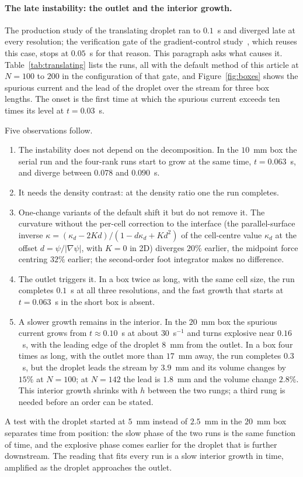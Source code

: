 \documentclass[preprint,3p,11pt]{elsarticle}
\newcommand{\psilev}{\psi}                       %
\newcommand{\gradpsi}{\lvert\nabla\psilev\rvert}
\begin{document}
\paragraph{The late instability: the outlet and the interior growth.}
\label{sec:translating-late}
The production study of the translating droplet ran to $0.1$~s and diverged late at every
resolution; the verification gate of the gradient-control study~\cite{maric2026gcls},
which reuses this case, stops at $0.05$~s for that reason. This paragraph asks what causes
it. Table~\ref{tab:translating} lists the runs, all with the default method of this
article at $N=100$ to $200$ in the configuration of that gate, and Figure~\ref{fig:boxes}
shows the spurious current and the lead of the droplet over the stream for three box
lengths. The onset is the first time at which the spurious current exceeds ten times its
level at $t=0.03$~s.

Five observations follow.
\begin{enumerate}
  \item The instability does not depend on the decomposition. In the $10$~mm box the
  serial run and the four-rank runs start to grow at the same time, $t=0.063$~s, and
  diverge between $0.078$ and $0.090$~s.
  \item It needs the density contrast: at the density ratio one the run completes.
  \item One-change variants of the default shift it but do not remove it. The curvature
  without the per-cell correction to the interface (the parallel-surface inverse
  $\kappa=(\kappa_d-2Kd)/(1-d\kappa_d+Kd^2)$ of the cell-centre value $\kappa_d$ at the
  offset $d=\psilev/\gradpsi$, with $K=0$ in 2D) diverges $20\%$ earlier, the midpoint
  force centring $32\%$ earlier; the second-order foot integrator makes no difference.
  \item The outlet triggers it. In a box twice as long, with the same cell size, the run
  completes $0.1$~s at all three resolutions, and the fast growth that starts at
  $t=0.063$~s in the short box is absent.
  \item A slower growth remains in the interior. In the $20$~mm box the spurious current
  grows from $t\approx0.10$~s at about $30$~s$^{-1}$ and turns explosive near $0.16$~s,
  with the leading edge of the droplet $8$~mm from the outlet. In a box four times as
  long, with the outlet more than $17$~mm away, the run completes $0.3$~s, but the
  droplet leads the stream by $3.9$~mm and its volume changes by $15\%$ at $N=100$; at
  $N=142$ the lead is $1.8$~mm and the volume change $2.8\%$. This interior growth shrinks
  with $h$ between the two rungs; a third rung is needed before an order can be stated.
\end{enumerate}
A test with the droplet started at $5$~mm instead of $2.5$~mm in the $20$~mm box
separates time from position: the slow phase of the two runs is the same function of
time, and the explosive phase comes earlier for the droplet that is further downstream.
The reading that fits every run is a slow interior growth in time, amplified as the
droplet approaches the outlet.
\end{document}
